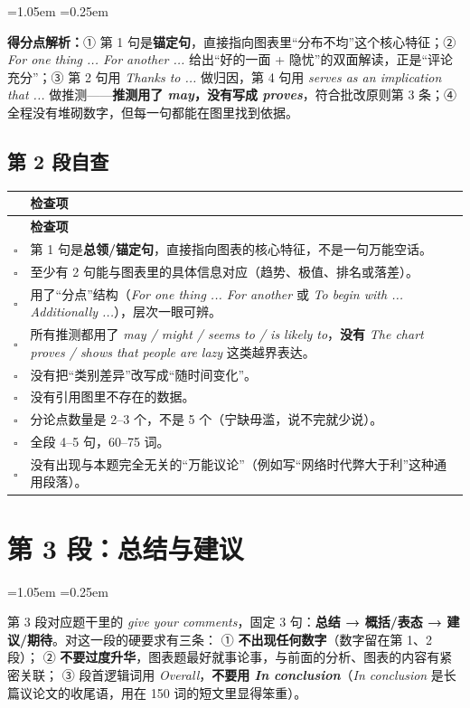 \documentclass[11pt,a4paper]{ctexart}
\newcommand{\en}[1]{\textit{#1}}
\newenvironment{note}{%
  \par\addvspace{5pt}%
  \begin{list}{}{\leftmargin=1.05em \rightmargin=0.25em \listparindent=0pt
    \itemindent=0pt \topsep=0pt \parsep=2pt \itemsep=2pt \partopsep=0pt}%
  \item\relax\small\color{ink}%
}{%
  \end{list}\addvspace{5pt}%
}
\newcommand{\cb}{$\square$}
\begin{document}
\begin{note}
\textbf{得分点解析：}① 第 1 句是\textbf{锚定句}，直接指向图表里“分布不均”这个核心特征；② \en{For one thing ... For another ...} 给出“好的一面 + 隐忧”的双面解读，正是“评论充分”；③ 第 2 句用 \en{Thanks to ...} 做归因，第 4 句用 \en{serves as an implication that ...} 做推测——\textbf{推测用了 \en{may}，没有写成 \en{proves}}，符合批改原则第 3 条；④ 全程没有堆砌数字，但每一句都能在图里找到依据。
\end{note}

\subsection{第 2 段自查}

\begin{longtable}{C{0.8cm} L{13.6cm}}
\toprule
& \textbf{检查项}\\
\midrule
\endfirsthead
\toprule
& \textbf{检查项}\\
\midrule
\endhead
\cb & 第 1 句是\textbf{总领/锚定句}，直接指向图表的核心特征，不是一句万能空话。\\
\cb & 至少有 2 句能与图表里的具体信息对应（趋势、极值、排名或落差）。\\
\cb & 用了“分点”结构（\en{For one thing ... For another} 或 \en{To begin with ... Additionally ...}），层次一眼可辨。\\
\cb & 所有推测都用了 \en{may / might / seems to / is likely to}，\textbf{没有} \en{The chart proves / shows that people are lazy} 这类越界表达。\\
\cb & 没有把“类别差异”改写成“随时间变化”。\\
\cb & 没有引用图里不存在的数据。\\
\cb & 分论点数量是 2--3 个，不是 5 个（宁缺毋滥，说不完就少说）。\\
\cb & 全段 4--5 句，60--75 词。\\
\cb & 没有出现与本题完全无关的“万能议论”（例如写“网络时代弊大于利”这种通用段落）。\\
\bottomrule
\end{longtable}

\clearpage

\section{第 3 段：总结与建议}

\begin{note}
第 3 段对应题干里的 \en{give your comments}，固定 3 句：\textbf{总结 → 概括/表态 → 建议/期待}。对这一段的硬要求有三条：
① \textbf{不出现任何数字}（数字留在第 1、2 段）；
② \textbf{不要过度升华}，图表题最好就事论事，与前面的分析、图表的内容有紧密关联；
③ 段首逻辑词用 \en{Overall}，\textbf{不要用 \en{In conclusion}}（\en{In conclusion} 是长篇议论文的收尾语，用在 150 词的短文里显得笨重）。
\end{note}
\end{document}
